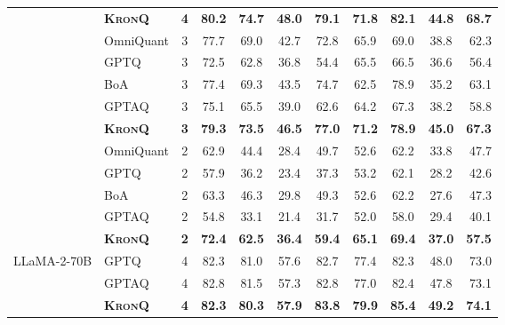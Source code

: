\documentclass{article} %
\newcommand{\KronQ}{\textsc{KronQ}}
\begin{document}
\begin{longtable}{l||l|c|cccccccr}
 & \cellcolor{gray!15}\textbf{\KronQ} & \cellcolor{gray!15}\textbf{4} & \cellcolor{gray!15}\textbf{80.2} & \cellcolor{gray!15}\textbf{74.7} & \cellcolor{gray!15}\textbf{48.0} & \cellcolor{gray!15}\textbf{79.1} & \cellcolor{gray!15}\textbf{71.8} & \cellcolor{gray!15}\textbf{82.1} & \cellcolor{gray!15}\textbf{44.8} & \cellcolor{gray!15}\textbf{68.7} \\
\cline{2-11}
 & OmniQuant & 3 & 77.7 & 69.0 & 42.7 & 72.8 & 65.9 & 69.0 & 38.8 & 62.3 \\
 & GPTQ      & 3 & 72.5 & 62.8 & 36.8 & 54.4 & 65.5 & 66.5 & 36.6 & 56.4 \\
 & BoA       & 3 & 77.4 & 69.3 & 43.5 & 74.7 & 62.5 & 78.9 & 35.2 & 63.1 \\
 & GPTAQ     & 3 & 75.1 & 65.5 & 39.0 & 62.6 & 64.2 & 67.3 & 38.2 & 58.8 \\
 & \cellcolor{gray!15}\textbf{\KronQ} & \cellcolor{gray!15}\textbf{3} & \cellcolor{gray!15}\textbf{79.3} & \cellcolor{gray!15}\textbf{73.5} & \cellcolor{gray!15}\textbf{46.5} & \cellcolor{gray!15}\textbf{77.0} & \cellcolor{gray!15}\textbf{71.2} & \cellcolor{gray!15}\textbf{78.9} & \cellcolor{gray!15}\textbf{45.0} & \cellcolor{gray!15}\textbf{67.3} \\
\cline{2-11}
 & OmniQuant & 2 & 62.9 & 44.4 & 28.4 & 49.7 & 52.6 & 62.2 & 33.8 & 47.7 \\
 & GPTQ      & 2 & 57.9 & 36.2 & 23.4 & 37.3 & 53.2 & 62.1 & 28.2 & 42.6 \\
 & BoA       & 2 & 63.3 & 46.3 & 29.8 & 49.3 & 52.6 & 62.2 & 27.6 & 47.3 \\
 & GPTAQ     & 2 & 54.8 & 33.1 & 21.4 & 31.7 & 52.0 & 58.0 & 29.4 & 40.1 \\
 & \cellcolor{gray!15}\textbf{\KronQ} & \cellcolor{gray!15}\textbf{2} & \cellcolor{gray!15}\textbf{72.4} & \cellcolor{gray!15}\textbf{62.5} & \cellcolor{gray!15}\textbf{36.4} & \cellcolor{gray!15}\textbf{59.4} & \cellcolor{gray!15}\textbf{65.1} & \cellcolor{gray!15}\textbf{69.4} & \cellcolor{gray!15}\textbf{37.0} & \cellcolor{gray!15}\textbf{57.5} \\
\hline
\multirow{11}{*}{LLaMA-2-70B}
 & GPTQ  & 4 & 82.3 & 81.0 & 57.6 & 82.7 & 77.4 & 82.3 & 48.0 & 73.0 \\
 & GPTAQ & 4 & 82.8 & 81.5 & 57.3 & 82.8 & 77.0 & 82.4 & 47.8 & 73.1 \\
 & \cellcolor{gray!15}\textbf{\KronQ} & \cellcolor{gray!15}\textbf{4} & \cellcolor{gray!15}\textbf{82.3} & \cellcolor{gray!15}\textbf{80.3} & \cellcolor{gray!15}\textbf{57.9} & \cellcolor{gray!15}\textbf{83.8} & \cellcolor{gray!15}\textbf{79.9} & \cellcolor{gray!15}\textbf{85.4} & \cellcolor{gray!15}\textbf{49.2} & \cellcolor{gray!15}\textbf{74.1} \\

\end{longtable}
\end{document}
